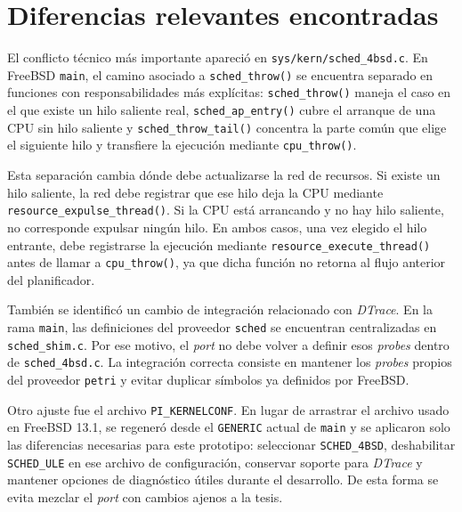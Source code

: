 \section{Diferencias relevantes encontradas}

El conflicto técnico más importante apareció en \verb|sys/kern/sched_4bsd.c|. En FreeBSD \texttt{main}, el camino asociado a \verb|sched_throw()| se encuentra separado en funciones con responsabilidades más explícitas: \verb|sched_throw()| maneja el caso en el que existe un hilo saliente real, \verb|sched_ap_entry()| cubre el arranque de una CPU sin hilo saliente y \verb|sched_throw_tail()| concentra la parte común que elige el siguiente hilo y transfiere la ejecución mediante \verb|cpu_throw()|.\par

Esta separación cambia dónde debe actualizarse la red de recursos. Si existe un hilo saliente, la red debe registrar que ese hilo deja la CPU mediante \verb|resource_expulse_thread()|. Si la CPU está arrancando y no hay hilo saliente, no corresponde expulsar ningún hilo. En ambos casos, una vez elegido el hilo entrante, debe registrarse la ejecución mediante \verb|resource_execute_thread()| antes de llamar a \verb|cpu_throw()|, ya que dicha función no retorna al flujo anterior del planificador.\par

También se identificó un cambio de integración relacionado con \textit{DTrace}. En la rama \texttt{main}, las definiciones del proveedor \verb|sched| se encuentran centralizadas en \verb|sched_shim.c|. Por ese motivo, el \textit{port} no debe volver a definir esos \textit{probes} dentro de \verb|sched_4bsd.c|. La integración correcta consiste en mantener los \textit{probes} propios del proveedor \verb|petri| y evitar duplicar símbolos ya definidos por FreeBSD.\par

Otro ajuste fue el archivo \verb|PI_KERNELCONF|. En lugar de arrastrar el archivo usado en FreeBSD 13.1, se regeneró desde el \verb|GENERIC| actual de \texttt{main} y se aplicaron solo las diferencias necesarias para este prototipo: seleccionar \verb|SCHED_4BSD|, deshabilitar \verb|SCHED_ULE| en ese archivo de configuración, conservar soporte para \textit{DTrace} y mantener opciones de diagnóstico útiles durante el desarrollo. De esta forma se evita mezclar el \textit{port} con cambios ajenos a la tesis.\par

